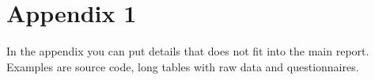 \documentclass[a4paper,12pt]{article}
\begin{document}
\hypersetup{urlcolor=black}


\newpage
\setcounter{page}{1} %
\appendix

\section{Appendix 1} 
In the appendix you can put details that does not fit into the main report. Examples are source code, long tables with raw data and questionnaires.
\end{document}
